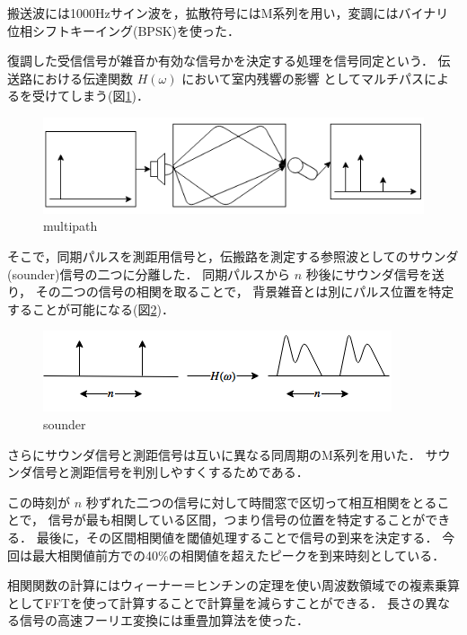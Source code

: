 搬送波には1000Hzサイン波を，拡散符号にはM系列を用い，変調にはバイナリ位相シフトキーイング(BPSK)を使った．

復調した受信信号が雑音か有効な信号かを決定する処理を信号同定という．
伝送路における伝達関数 $H(\omega)$ において室内残響の影響
としてマルチパスによるを受けてしまう(図\ref{fig:multipath})．

\begin{figure}[tb]\centering
  \hspace{-2mm}\includegraphics[clip,width=1.1\hsize]{img/multipath.png}
  \caption{multipath}\label{fig:multipath}
\end{figure}


そこで，同期パルスを測距用信号と，伝搬路を測定する参照波としてのサウンダ(sounder)信号の二つに分離した．
同期パルスから $n$ 秒後にサウンダ信号を送り，
その二つの信号の相関を取ることで，
背景雑音とは別にパルス位置を特定することが可能になる(図\ref{fig:sounder})．

\begin{figure}[tb]\centering
  \hspace{-2mm}\includegraphics[clip,width=1.1\hsize]{img/sounder.png}
  \caption{sounder}\label{fig:sounder}
\end{figure}

さらにサウンダ信号と測距信号は互いに異なる同周期のM系列を用いた．
サウンダ信号と測距信号を判別しやすくするためである．

この時刻が $n$ 秒ずれた二つの信号に対して時間窓で区切って相互相関をとることで，
信号が最も相関している区間，つまり信号の位置を特定することができる．
最後に，その区間相関値を閾値処理することで信号の到来を決定する．
今回は最大相関値前方での40\%の相関値を超えたピークを到来時刻としている．

相関関数の計算にはウィーナー＝ヒンチンの定理を使い周波数領域での複素乗算としてFFTを使って計算することで計算量を減らすことができる．
長さの異なる信号の高速フーリエ変換には重畳加算法\cite{overwrap}を使った．
